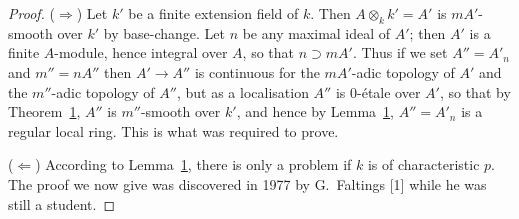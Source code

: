 \begin{proof}
($\Rightarrow$) Let $k'$ be a finite extension field of $k$. Then $A \otimes_k k' = A'$ is
$mA'$-smooth over $k'$ by base-change. Let $n$ be any maximal ideal of $A'$; then $A'$ is
a finite $A$-module, hence integral over $A$, so that $n \supset mA'$. Thus if we set
$A'' = A'_n$ and $m'' = nA''$ then $A' \to A''$ is continuous for the $mA'$-adic topology of
$A'$ and the $m''$-adic topology of $A''$, but as a localisation $A''$ is 0-\'etale over $A'$,
so that by Theorem~\hyperref[thm:28.1]{1}, $A''$ is $m''$-smooth over $k'$, and hence by
Lemma~\hyperref[lem:28.1]{1}, $A'' = A'_n$ is a regular local ring. This is what was required
to prove.

($\Leftarrow$) According to Lemma~\hyperref[lem:28.1]{1}, there is only a problem if $k$ is of
characteristic $p$. The proof we now give was discovered in 1977 by G.~Faltings
[1] while he was still a student.


\end{proof}
